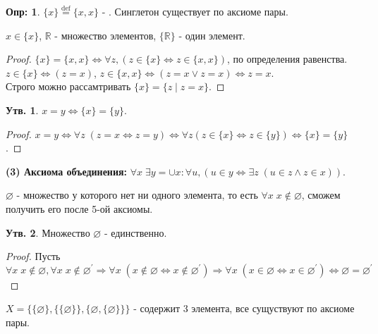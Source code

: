 \documentclass[12pt]{article}
\theoremstyle{definition}
\newtheorem{defn}{Опр:}
\newtheorem{prop}{Утв.}
\begin{document}
\begin{defn}
	$\{x\}\stackrel{\text{def}}{=} \{x,x\}$ - . Синглетон существует по аксиоме пары.
\end{defn}

$x \in \{x\}$, $\mathbb{R}$ - множество элементов, $\{\mathbb{R}\}$ - один элемент.

\begin{proof}
		$\{x\} = \{x,x\} \Leftrightarrow \forall z, (z \in \{x\} \Leftrightarrow z \in \{x,x\})$, по определения равенства.\\ 
		$z \in  \{x\} \Leftrightarrow (z =x)$, $z \in \{x,x\} \Leftrightarrow (z = x \vee z =x) \Leftrightarrow z = x$.\\ 
		Строго можно рассамтривать $\{x\} = \{z \mid z = x\}$.
\end{proof}

\begin{prop}
	$x = y \Leftrightarrow \{x\} = \{y\}$.
\end{prop}

\begin{proof}
	$x = y \Leftrightarrow \forall z \; (z = x \Leftrightarrow z = y) \Leftrightarrow \forall z (z\in \{x\} \Leftrightarrow z \in \{y\}) \Leftrightarrow \{x\} = \{y\}$.
\end{proof}

\textbf{(3) Аксиома объединения:} $\forall x \; \exists y = \cup x \colon \forall u, (u \in y \Leftrightarrow \exists z \; (u \in z \wedge z \in x))$.

$\varnothing$ - множество у которого нет ни одного элемента, то есть $\forall x \; x \notin \varnothing$, сможем получить его после 5-ой аксиомы.

\begin{prop}
	Множество $\varnothing$ - единственно.
\end{prop}

\begin{proof}
	Пусть $\forall x \; x \notin \varnothing, \forall x \; x \notin \varnothing^\prime \Rightarrow \forall x \; (x \notin \varnothing \Leftrightarrow x \notin \varnothing^\prime) \Rightarrow \forall x \; (x \in \varnothing \Leftrightarrow x \in \varnothing^\prime) \Leftrightarrow \varnothing = \varnothing^\prime$
\end{proof}

$X = \Big\{\{\varnothing\}, \big\{\{\varnothing\}\big\}, \big\{\varnothing, \{\varnothing\}\big\}\Big\}$ - содержит 3 элемента, все сущуствуют по аксиоме пары.
\end{document}

